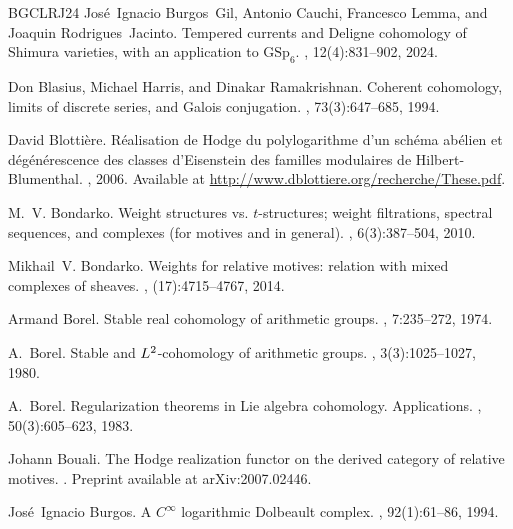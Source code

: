 \documentclass[11pt, a4paper]{amsart}
\theoremstyle{plain}
\theoremstyle{definition}
\numberwithin{equation}{section}
\begin{document}
\begin{thebibliography}{BGCLRJ24}
Jos{\'e}~Ignacio Burgos~Gil, Antonio Cauchi, Francesco Lemma, and Joaquin
  Rodrigues~Jacinto.
\newblock Tempered currents and {D}eligne cohomology of {S}himura varieties,
  with an application to {$\mathrm{GSp}_6$}.
, 12(4):831--902, 2024.

Don Blasius, Michael Harris, and Dinakar Ramakrishnan.
\newblock Coherent cohomology, limits of discrete series, and {G}alois
  conjugation.
, 73(3):647--685, 1994.

David Blotti\`{e}re.
\newblock R\'{e}alisation de {H}odge du polylogarithme d’un sch\'{e}ma
  ab\'{e}lien et d\'{e}g\'{e}n\'{e}rescence des classes d’{E}isenstein des
  familles modulaires de {H}ilbert-{B}lumenthal.
, 2006.
\newblock Available at \url{http://www.dblottiere.org/recherche/These.pdf}.

M.~V. Bondarko.
\newblock Weight structures vs. {$t$}-structures; weight filtrations, spectral
  sequences, and complexes (for motives and in general).
, 6(3):387--504, 2010.

Mikhail~V. Bondarko.
\newblock Weights for relative motives: relation with mixed complexes of
  sheaves.
, (17):4715--4767, 2014.

Armand Borel.
\newblock Stable real cohomology of arithmetic groups.
, 7:235--272, 1974.

A.~Borel.
\newblock Stable and {$L\sp{2}$}-cohomology of arithmetic groups.
, 3(3):1025--1027, 1980.

A.~Borel.
\newblock Regularization theorems in {L}ie algebra cohomology. {A}pplications.
, 50(3):605--623, 1983.

Johann Bouali.
\newblock The {H}odge realization functor on the derived category of relative
  motives.
.
\newblock Preprint available at arXiv:2007.02446.

Jos\'e{}~Ignacio Burgos.
\newblock A {$C^\infty$} logarithmic {D}olbeault complex.
, 92(1):61--86, 1994.


\end{thebibliography}
\end{document}

